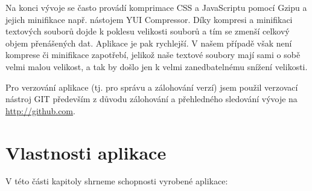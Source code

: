 Na konci vývoje se často provádí komprimace CSS a JavaScriptu pomocí Gzipu a jejich minifikace např. nástojem YUI Compressor.
Díky kompresi a minifikaci textových souborů dojde k poklesu velikosti souborů a tím se zmenší celkový objem přenášených dat. Aplikace je pak rychlejší.
V našem případě však není komprese či minifikace zapotřebí, jelikož naše textové soubory mají sami o sobě velmi malou velikost, 
a tak by došlo jen k velmi zanedbatelnému snížení velikosti.

Pro verzování aplikace (tj. pro správu a zálohování verzí) jsem použil verzovací nástroj GIT především z důvodu zálohování a přehledného sledování vývoje na \url{http://github.com}. 

\section{Vlastnosti aplikace}

V této části kapitoly shrneme schopnosti vyrobené aplikace:

